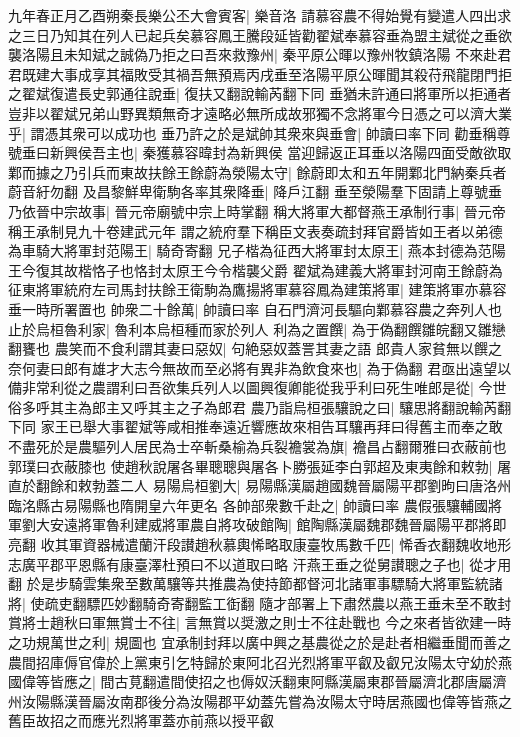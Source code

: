 九年春正月乙酉朔秦長樂公丕大會賓客|{
	樂音洛}
請慕容農不得始覺有變遣人四出求之三日乃知其在列人已起兵矣慕容鳳王騰段延皆勸翟斌奉慕容垂為盟主斌從之垂欲襲洛陽且未知斌之誠偽乃拒之曰吾來救豫州|{
	秦平原公暉以豫州牧鎮洛陽}
不來赴君君既建大事成享其福敗受其禍吾無預焉丙戌垂至洛陽平原公暉聞其殺苻飛龍閉門拒之翟斌復遣長史郭通往說垂|{
	復扶又翻說輸芮翻下同}
垂猶未許通曰將軍所以拒通者豈非以翟斌兄弟山野異類無奇才遠略必無所成故邪獨不念將軍今日憑之可以濟大業乎|{
	謂憑其衆可以成功也}
垂乃許之於是斌帥其衆來與垂會|{
	帥讀曰率下同}
勸垂稱尊號垂曰新興侯吾主也|{
	秦獲慕容暐封為新興侯}
當迎歸返正耳垂以洛陽四面受敵欲取鄴而據之乃引兵而東故扶餘王餘蔚為滎陽太守|{
	餘蔚即太和五年開鄴北門納秦兵者蔚音紆勿翻}
及昌黎鮮卑衛駒各率其衆降垂|{
	降戶江翻}
垂至滎陽羣下固請上尊號垂乃依晉中宗故事|{
	晉元帝廟號中宗上時掌翻}
稱大將軍大都督燕王承制行事|{
	晉元帝稱王承制見九十卷建武元年}
謂之統府羣下稱臣文表奏疏封拜官爵皆如王者以弟德為車騎大將軍封范陽王|{
	騎奇寄翻}
兄子楷為征西大將軍封太原王|{
	燕本封德為范陽王今復其故楷恪子也恪封太原王今令楷襲父爵}
翟斌為建義大將軍封河南王餘蔚為征東將軍統府左司馬封扶餘王衛駒為鷹揚將軍慕容鳳為建策將軍|{
	建策將軍亦慕容垂一時所署置也}
帥衆二十餘萬|{
	帥讀曰率}
自石門濟河長驅向鄴慕容農之奔列人也止於烏桓魯利家|{
	魯利本烏桓種而家於列人}
利為之置饌|{
	為于偽翻饌雛皖翻又雛戀翻饔也}
農笑而不食利謂其妻曰惡奴|{
	句絶惡奴蓋詈其妻之語}
郎貴人家貧無以饌之奈何妻曰郎有雄才大志今無故而至必將有異非為飲食來也|{
	為于偽翻}
君亟出遠望以備非常利從之農謂利曰吾欲集兵列人以圖興復卿能從我乎利曰死生唯郎是從|{
	今世俗多呼其主為郎主又呼其主之子為郎君}
農乃詣烏桓張驤說之曰|{
	驤思將翻說輸芮翻下同}
家王已舉大事翟斌等咸相推奉遠近響應故來相告耳驤再拜曰得舊主而奉之敢不盡死於是農驅列人居民為士卒斬桑榆為兵裂襜裳為旗|{
	襜昌占翻爾雅曰衣蔽前也郭璞曰衣蔽膝也}
使趙秋說屠各畢聰聰與屠各卜勝張延李白郭超及東夷餘和敕勃|{
	屠直於翻餘和敕勃蓋二人}
易陽烏桓劉大|{
	易陽縣漢屬趙國魏晉屬陽平郡劉昫曰唐洛州臨洺縣古易陽縣也隋開皇六年更名}
各帥部衆數千赴之|{
	帥讀曰率}
農假張驤輔國將軍劉大安遠將軍魯利建威將軍農自將攻破館陶|{
	館陶縣漢屬魏郡魏晉屬陽平郡將即亮翻}
收其軍資器械遣蘭汗段讃趙秋慕輿悕略取康臺牧馬數千匹|{
	悕香衣翻魏收地形志廣平郡平恩縣有康臺澤杜預曰不以道取曰略}
汗燕王垂之從舅讃聰之子也|{
	從才用翻}
於是步騎雲集衆至數萬驤等共推農為使持節都督河北諸軍事驃騎大將軍監統諸將|{
	使疏吏翻驃匹妙翻騎奇寄翻監工衘翻}
隨才部署上下肅然農以燕王垂未至不敢封賞將士趙秋曰軍無賞士不往|{
	言無賞以奨激之則士不往赴戰也}
今之來者皆欲建一時之功規萬世之利|{
	規圖也}
宜承制封拜以廣中興之基農從之於是赴者相繼垂聞而善之農間招庫傉官偉於上黨東引乞特歸於東阿北召光烈將軍平叡及叡兄汝陽太守幼於燕國偉等皆應之|{
	間古莧翻遣間使招之也傉奴沃翻東阿縣漢屬東郡晉屬濟北郡唐屬濟州汝陽縣漢晉屬汝南郡後分為汝陽郡平幼蓋先嘗為汝陽太守時居燕國也偉等皆燕之舊臣故招之而應光烈將軍蓋亦前燕以授平叡}
